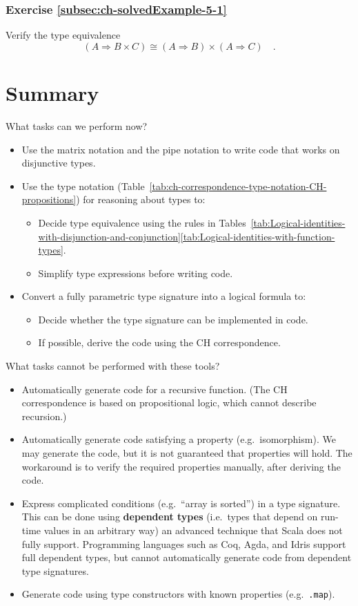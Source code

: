\subsubsection{Exercise \label{subsec:ch-solvedExample-5-1}\ref{subsec:ch-solvedExample-5-1}}

Verify the type equivalence
\[
\left(A\Rightarrow B\times C\right)\cong\left(A\Rightarrow B\right)\times\left(A\Rightarrow C\right)\quad.
\]


\section{Summary}

What tasks can we perform now?
\begin{itemize}
\item Use the matrix notation and the pipe notation to write code that works
on disjunctive types.
\item Use the type notation (Table~\ref{tab:ch-correspondence-type-notation-CH-propositions})
for reasoning about types to:
\begin{itemize}
\item Decide type equivalence using the rules in Tables~\ref{tab:Logical-identities-with-disjunction-and-conjunction}\textendash \ref{tab:Logical-identities-with-function-types}.
\item Simplify type expressions before writing code.
\end{itemize}
\item Convert a fully parametric type signature into a logical formula to:
\begin{itemize}
\item Decide whether the type signature can be implemented in code.
\item If possible, derive the code using the CH correspondence.
\end{itemize}
\end{itemize}
What tasks cannot be performed with these tools?
\begin{itemize}
\item Automatically generate code for a recursive function. (The CH correspondence
is based on propositional logic, which cannot describe recursion.)
\item Automatically generate code satisfying a property (e.g.\ isomorphism).
We may generate the code, but it is not guaranteed that properties
will hold. The workaround is to verify the required properties manually,
after deriving the code.
\item Express complicated conditions (e.g.\ ``array is sorted'') in a
type signature. This can be done using \textbf{dependent types}
(i.e.~types that depend on run-time values in an arbitrary way) \textendash{}
an advanced technique that Scala does not fully support. Programming
languages such as Coq, Agda, and Idris support full dependent types,
but cannot automatically generate code from dependent type signatures.
\item Generate code using type constructors with known properties (e.g.\ \lstinline!.map!).
\end{itemize}
